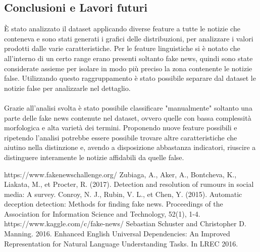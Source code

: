 \documentclass{article}
\begin{document}
\begin{multicols}{2}
		\section{Conclusioni e Lavori futuri}	
		È stato analizzato il dataset applicando diverse feature a tutte le notizie che conteneva e sono stati generati i grafici delle distribuzioni, per analizzare i valori prodotti dalle varie caratteristiche. Per le feature linguistiche si è notato che all'interno di un certo range erano presenti soltanto fake news, quindi sono state considerate assieme per isolare in modo più preciso la zona contenente le notizie false. Utilizzando questo raggruppamento è stato possibile separare dal dataset le notizie false per analizzarle nel dettaglio.
		\\~\\
		Grazie all'analisi svolta è stato possibile classificare "manualmente" soltanto una parte delle fake news contenute nel dataset, ovvero quelle con bassa complessità morfologica e alta varietà dei termini. Proponendo nuove feature possibili e ripetendo l'analisi potrebbe essere possibile trovare altre caratteristiche che aiutino nella distinzione e, avendo a disposizione abbastanza indicatori, riuscire a distinguere interamente le notizie affidabili da quelle false.
	   	\end{multicols}		       	

		\begin{thebibliography}{9}
				https://www.fakenewschallenge.org/
			Zubiaga, A., Aker, A., Bontcheva, K., Liakata, M., et Procter, R. (2017). Detection and resolution of rumours in social	media: A survey.
			Conroy, N. J., Rubin, V. L., et Chen, Y. (2015). Automatic deception detection: Methods for finding fake news.
			Proceedings of the Association for Information Science and Technology, 52(1), 1-4.
				https://www.kaggle.com/c/fake-news/
				 Sebastian Schuster and Christopher D. Manning. 2016. Enhanced English Universal Dependencies: An Improved Representation for Natural Language Understanding Tasks. In LREC 2016. 
		\end{thebibliography}
\end{document}
